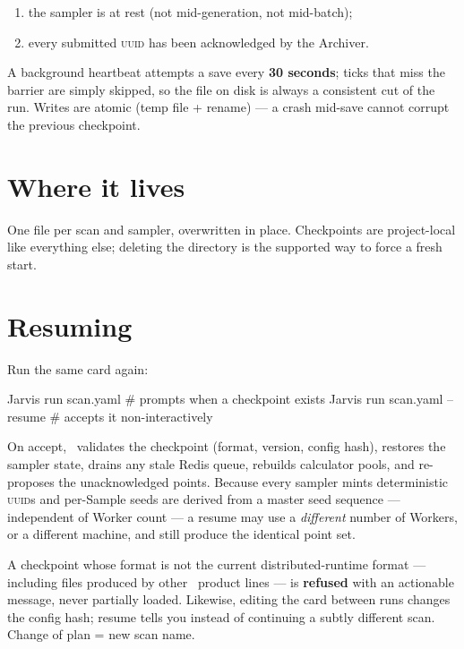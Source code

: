 \begin{enumerate}
  \item the sampler is at rest (not mid-generation, not mid-batch);
  \item every submitted \textsc{uuid} has been acknowledged by the Archiver.
\end{enumerate}

A background heartbeat attempts a save every \textbf{30 seconds}; ticks that miss the
barrier are simply skipped, so the file on disk is always a consistent cut of the run.
Writes are atomic (temp file + rename) --- a crash mid-save cannot corrupt the previous
checkpoint.

\section{Where it lives}
\label{sec:checkpoint-location}

\begin{quote}
\end{quote}

One file per scan and sampler, overwritten in place. Checkpoints are project-local like
everything else; deleting the directory is the supported way to force a fresh start.

\section{Resuming}
\label{sec:resuming}

Run the same card again:

\begin{terminal}
\begin{jcmd}
Jarvis run scan.yaml            # prompts when a checkpoint exists
Jarvis run scan.yaml --resume   # accepts it non-interactively
\end{jcmd}
\end{terminal}

On accept, \Jtwo\ validates the checkpoint (format, version, config hash), restores the
sampler state, drains any stale Redis queue, rebuilds calculator pools, and re-proposes
the unacknowledged points. Because every sampler mints deterministic \textsc{uuid}s and
per-Sample seeds are derived from a master seed sequence --- independent of Worker count
--- a resume may use a \emph{different} number of Workers, or a different machine, and
still produce the identical point set.

\begin{jwarn}
A checkpoint whose format is not the current distributed-runtime format --- including
files produced by other \Jarvis\ product lines --- is \textbf{refused} with an
actionable message, never partially loaded. Likewise, editing the card between runs
changes the config hash; resume tells you instead of continuing a subtly different
scan. Change of plan = new scan name.
\end{jwarn}

